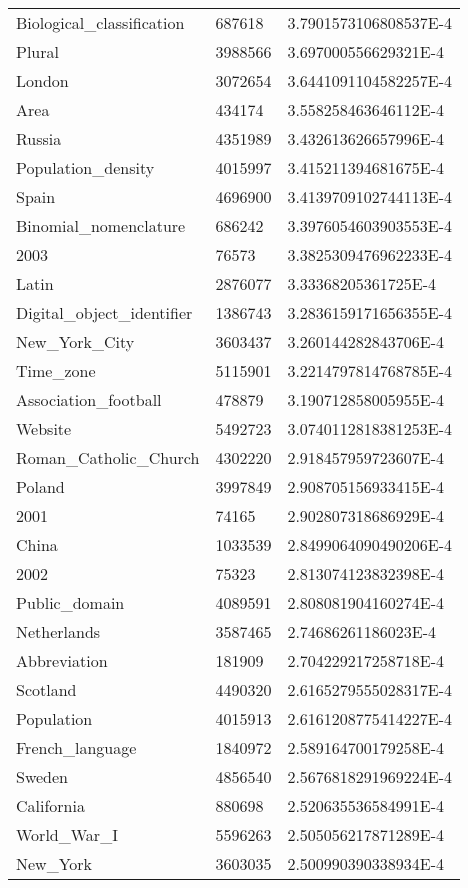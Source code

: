 \documentclass[a4paper]{article}
\begin{document}
\begin{center}
\begin{longtable}{|l|l|l|}
Biological\_classification & 687618 & 3.7901573106808537E-4 \\
Plural & 3988566 & 3.697000556629321E-4 \\
London & 3072654 & 3.6441091104582257E-4 \\
Area & 434174 & 3.558258463646112E-4 \\
Russia & 4351989 & 3.432613626657996E-4 \\
Population\_density & 4015997 & 3.415211394681675E-4 \\
Spain & 4696900 & 3.4139709102744113E-4 \\
Binomial\_nomenclature & 686242 & 3.3976054603903553E-4 \\
2003 & 76573 & 3.3825309476962233E-4 \\
Latin & 2876077 & 3.33368205361725E-4 \\
Digital\_object\_identifier & 1386743 & 3.2836159171656355E-4 \\
New\_York\_City & 3603437 & 3.260144282843706E-4 \\
Time\_zone & 5115901 & 3.2214797814768785E-4 \\
Association\_football & 478879 & 3.190712858005955E-4 \\
Website & 5492723 & 3.0740112818381253E-4 \\
Roman\_Catholic\_Church & 4302220 & 2.918457959723607E-4 \\
Poland & 3997849 & 2.908705156933415E-4 \\
2001 & 74165 & 2.902807318686929E-4 \\
China & 1033539 & 2.8499064090490206E-4 \\
2002 & 75323 & 2.813074123832398E-4 \\
Public\_domain & 4089591 & 2.808081904160274E-4 \\
Netherlands & 3587465 & 2.74686261186023E-4 \\
Abbreviation & 181909 & 2.704229217258718E-4 \\
Scotland & 4490320 & 2.6165279555028317E-4 \\
Population & 4015913 & 2.6161208775414227E-4 \\
French\_language & 1840972 & 2.589164700179258E-4 \\
Sweden & 4856540 & 2.5676818291969224E-4 \\
California & 880698 & 2.520635536584991E-4 \\
World\_War\_I & 5596263 & 2.505056217871289E-4 \\
New\_York & 3603035 & 2.500990390338934E-4 \\

\end{longtable}
\end{center}
\end{document}
